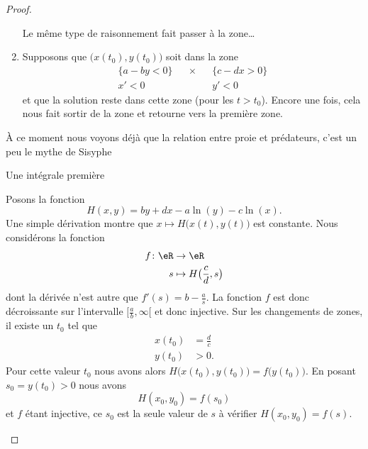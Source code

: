 \begin{proof}
\begin{subproof}
\begin{enumerate}
        Le même type de raisonnement fait passer à la zone\ldots
    \item
        Supposons que \( \big( x(t_0),y(t_0) \big) \) soit dans la zone
        \begin{subequations}
            \begin{align}
                \{ a-by<0 \}&&\times&& \{ c-dx>0 \}\\
                x'<0&&&&y'<0
            \end{align}
        \end{subequations}
        et que la solution reste dans cette zone (pour les \( t>t_0\)). Encore une fois, cela nous fait sortir de la zone et retourne vers la première zone.
        \end{enumerate}

       À ce moment nous voyons déjà que la relation entre proie et prédateurs, c'est un peu le mythe de Sisyphe

   \item[Une intégrale première]

       Posons la fonction
       \begin{equation}
           H(x,y)=by+dx-a\ln(y)-c\ln(x).
       \end{equation}
       Une simple dérivation montre que  \(  x\mapsto H\big( x(t),y(t) \big) \) est constante. Nous considérons la fonction
       \begin{equation}
           \begin{aligned}
               f\colon \eR&\to \eR \\
               s&\mapsto H\big( \frac{ c }{ d },s \big)
           \end{aligned}
       \end{equation}
       dont la dérivée n'est autre que \( f'(s)=b-\frac{ a }{ s }\). La fonction \( f\) est donc décroissante sur l'intervalle \( \mathopen[ \frac{ a }{ b } , \infty [\) et donc injective. Sur les changements de zones, il existe un \( t_0\) tel que
           \begin{subequations}
               \begin{align}
                   x(t_0)&=\frac{ d }{ c }\\
                   y(t_0)&>0.
               \end{align}
           \end{subequations}
            Pour cette valeur \( t_0\) nous avons alors \( H\big( x(t_0),y(t_0) \big)=  f\big( y(t_0) \big)  \). En posant \( s_0=y(t_0)>0\) nous avons
            \begin{equation}
                H(x_0,y_0)=f(s_0)
            \end{equation}
            et \( f\) étant injective, ce \( s_0\) est la seule valeur de \( s\) à vérifier \( H(x_0,y_0)=f(s)\).


\end{subproof}
\end{proof}
